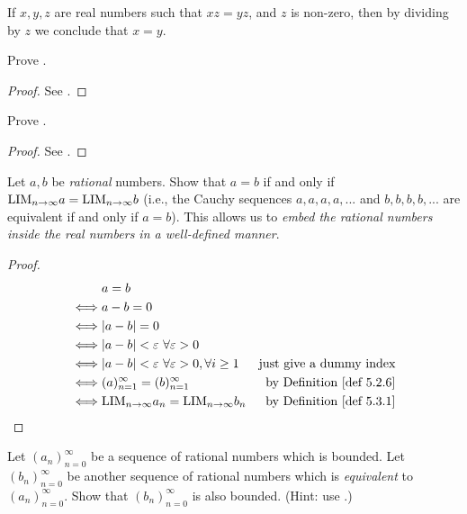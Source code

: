 \begin{lemma}  \label{lem 5.3.21}
If \(x, y, z\) are real numbers such that \(xz = yz\), and \(z\) is non-zero, then by dividing by \(z\) we conclude that \(x = y\).
\end{lemma}

\exercisesection

\begin{exercise} \label{exercise 5.3.1}
Prove .
\end{exercise}

\begin{proof}
See .
\end{proof}

\begin{exercise} \label{exercise 5.3.2}
Prove .
\end{exercise}

\begin{proof}
See .
\end{proof}

\begin{exercise} \label{exercise 5.3.3}
Let \(a, b\) be \emph{rational} numbers.
Show that \(a = b\) if and only if \(\text{LIM}_{n \to \infty} a = \text{LIM}_{n \to \infty} b\)
(i.e., the Cauchy sequences \(a, a, a, a, ...\) and \(b, b, b, b, ...\) are equivalent if and only if \(a = b\)).
This allows us to \emph{embed the rational numbers inside the real numbers in a well-defined manner}.
\end{exercise}

\begin{proof}
\begin{align*}
         & a = b \\
    \iff & a - b = 0 \\
    \iff & \abs{a - b} = 0 \\
    \iff & \abs{a - b} < \varE\ \forall \varE > 0 \\
    \iff & \abs{a - b} < \varE\ \forall \varE > 0, \forall i \ge 1 & \text{just give a dummy index} \\
    \iff & (a)_{n = 1}^{\infty} = (b)_{n = 1}^{\infty} & \text{by \DEF{5.2.6}} \\
    \iff & \LIM_{n \toINF} a_n = \LIM_{n \toINF} b_n & \text{by \DEF{5.3.1}}
\end{align*}
\end{proof}

\begin{exercise} \label{exercise 5.3.4}
Let \((a_n)_{n = 0}^{\infty}\) be a sequence of rational numbers which is bounded.
Let \((b_n)_{n = 0}^{\infty}\) be another sequence of rational numbers which is \emph{equivalent} to \((a_n)_{n = 0}^{\infty}\).
Show that \((b_n)_{n = 0}^{\infty}\) is also bounded.
(Hint: use .)
\end{exercise}

